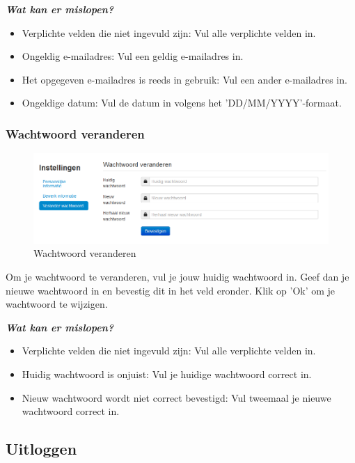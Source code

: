 \documentclass[]{article}
\begin{document}
\textbf{\textit{Wat kan er mislopen?}}

\begin{itemize}
\item Verplichte velden die niet ingevuld zijn: Vul alle verplichte velden in.
\item Ongeldig e-mailadres: Vul een geldig e-mailadres in.
\item Het opgegeven e-mailadres is reeds in gebruik: Vul een ander e-mailadres in.
\item Ongeldige datum: Vul de datum in volgens het 'DD/MM/YYYY'-formaat.
\end{itemize}

\subsubsection{Wachtwoord veranderen}

\begin{figure}[!ht]
	\centering
	\includegraphics[width=1\textwidth]{img/changepwd}
	\caption{Wachtwoord veranderen}
	\label{changepwd}
\end{figure} 

Om je wachtwoord te veranderen, vul je jouw huidig wachtwoord in. Geef dan je nieuwe wachtwoord in en bevestig dit in het veld eronder. Klik op 'Ok' om je wachtwoord te wijzigen.

\textbf{\textit{Wat kan er mislopen?}}

\begin{itemize}
\item Verplichte velden die niet ingevuld zijn: Vul alle verplichte velden in.
\item Huidig wachtwoord is onjuist: Vul je huidige wachtwoord correct in.
\item Nieuw wachtwoord wordt niet correct bevestigd: Vul tweemaal je nieuwe wachtwoord correct in.
\end{itemize}

\subsection{Uitloggen}
\end{document}
